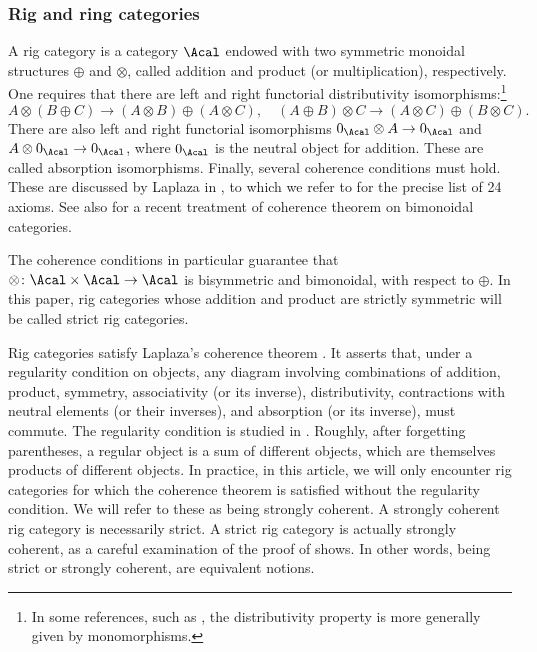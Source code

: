 \subsubsection{Rig and ring categories}\label{subsubsec:rig-and-ring-categories}

A rig category is a category $\Acal$ endowed with two symmetric monoidal structures $\oplus$ and $\otimes$, called addition and product (or multiplication), respectively. One requires that there are left and right functorial distributivity isomorphisms:\footnote{In some references, such as \cite{Laplaza}, the distributivity property is more generally given by monomorphisms.}\vspace*{-3pt}\enlargethispage{\baselineskip}
\begin{displaymath}
A\otimes (B\oplus C)\to (A\otimes B)\oplus (A\otimes C),\quad (A\oplus B)\otimes C\to (A\otimes C)\oplus (B\otimes C).
\end{displaymath}
There are also left and right functorial isomorphisms $ 0_{\Acal}\otimes A\to 0_{\Acal}$ and $A\otimes 0_{\Acal}\to 0_{\Acal}$, where $0_{\Acal}$ is the neutral object for addition. These are called absorption isomorphisms. Finally, several coherence conditions must hold. These are discussed by Laplaza in \cite[]{Laplaza}, to which we refer to for the precise list of 24 axioms. See also \cite[Vol.\,I]{Johnson-Yau} for a recent treatment of coherence theorem on bimonoidal categories.

The coherence conditions in particular guarantee that $\otimes\colon\Acal\times\Acal\to\Acal$ is bisymmetric and bimonoidal, with respect to $\oplus$. In this paper, rig categories whose addition and product are strictly symmetric will be called strict rig categories.

Rig categories satisfy Laplaza's coherence theorem \cite[]{Laplaza}. It asserts that, under a regularity condition on objects, any diagram involving combinations of addition, product, symmetry, associativity (or its inverse), distributivity, contractions with neutral elements (or their inverses), and absorption (or its inverse), must commute. The regularity condition is studied in \cite[]{Laplaza}. Roughly, after forgetting parentheses, a regular object is a sum of different objects, which are themselves products of different objects. In practice, in this article, we will only encounter rig categories for which the coherence theorem is satisfied without the regularity condition. We will refer to these as being strongly coherent. A strongly coherent rig category is necessarily strict. A strict rig category is actually strongly coherent, as a careful examination of the proof of \cite[Prop.\,10]{Laplaza} shows. In other words, being strict or strongly coherent, are equivalent notions.

